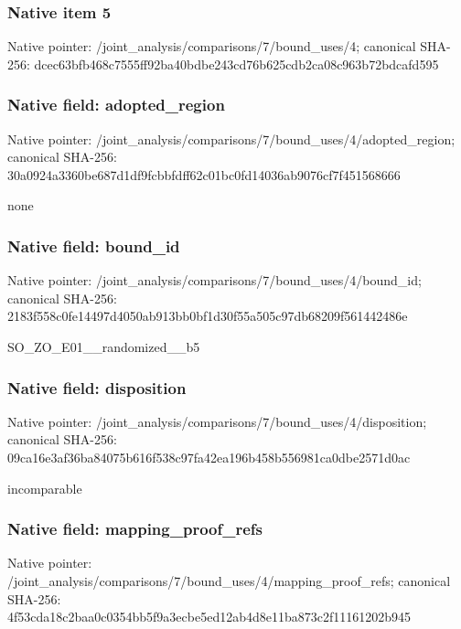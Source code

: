 \documentclass[10pt,a4paper]{article}
\begin{document}
\subsubsection{Native item 5}
Native pointer: /joint\_\allowbreak{}analysis/comparisons/7/bound\_\allowbreak{}uses/4; canonical SHA-256: dcec63bfb468c7555ff92ba40bdbe243cd76b625cdb2ca08c963b72bdcafd595

\subsubsection{Native field: adopted\_\allowbreak{}region}
Native pointer: /joint\_\allowbreak{}analysis/comparisons/7/bound\_\allowbreak{}uses/4/adopted\_\allowbreak{}region; canonical SHA-256: 30a0924a3360be687d1df9fcbbfdff62c01bc0fd14036ab9076cf7f451568666

\begingroup\raggedright\sloppy none\par\endgroup

\subsubsection{Native field: bound\_\allowbreak{}id}
Native pointer: /joint\_\allowbreak{}analysis/comparisons/7/bound\_\allowbreak{}uses/4/bound\_\allowbreak{}id; canonical SHA-256: 2183f558c0fe14497d4050ab913bb0bf1d30f55a505c97db68209f561442486e

\begingroup\raggedright\sloppy SO\_\allowbreak{}ZO\_\allowbreak{}E01\_\allowbreak{}\_\allowbreak{}randomized\_\allowbreak{}\_\allowbreak{}b5\par\endgroup

\subsubsection{Native field: disposition}
Native pointer: /joint\_\allowbreak{}analysis/comparisons/7/bound\_\allowbreak{}uses/4/disposition; canonical SHA-256: 09ca16e3af36ba84075b616f538c97fa42ea196b458b556981ca0dbe2571d0ac

\begingroup\raggedright\sloppy incomparable\par\endgroup

\subsubsection{Native field: mapping\_\allowbreak{}proof\_\allowbreak{}refs}
Native pointer: /joint\_\allowbreak{}analysis/comparisons/7/bound\_\allowbreak{}uses/4/mapping\_\allowbreak{}proof\_\allowbreak{}refs; canonical SHA-256: 4f53cda18c2baa0c0354bb5f9a3ecbe5ed12ab4d8e11ba873c2f11161202b945
\end{document}
